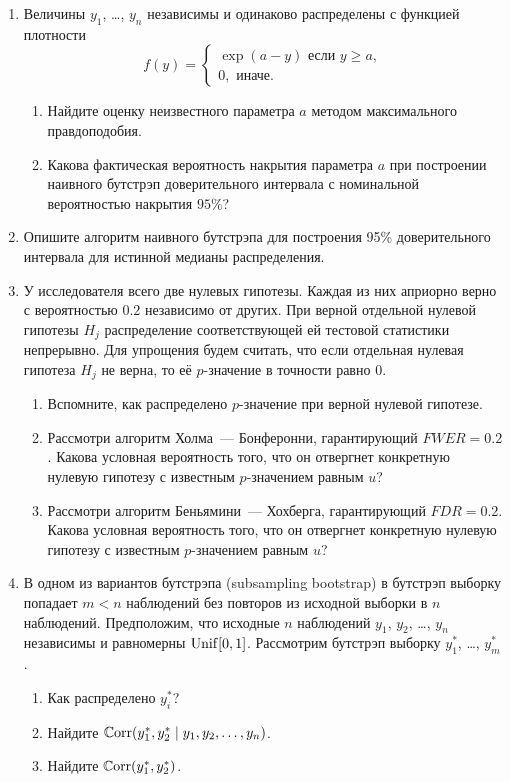 \begin{enumerate}[resume]
    \item Величины $y_1$, \dots, $y_n$ независимы и одинаково распределены 
    с функцией плотности 
    \[
    f(y) = \begin{cases}
        \exp(a - y) \text{ если } y \geq a, \\
        0, \text{ иначе.}
    \end{cases}
    \]
    \begin{enumerate}
        \item Найдите оценку неизвестного параметра $a$ методом максимального правдоподобия. 
        \item Какова фактическая вероятность накрытия параметра $a$ при построении наивного бутстрэп доверительного интервала с номинальной вероятностью накрытия $95\%$?
    \end{enumerate}

    \item Опишите алгоритм наивного бутстрэпа для построения 95\% доверительного интервала для истинной медианы распределения. 

    \item У исследователя всего две нулевых гипотезы. 
    Каждая из них априорно верно с вероятностью $0.2$ независимо от других. 
    При верной отдельной нулевой гипотезы $H_j$ распределение соответствующей ей тестовой статистики непрерывно.
    Для упрощения будем считать, что если отдельная нулевая гипотеза $H_j$ не верна, то её $p$-значение в точности равно $0$.

    \begin{enumerate}
        \item Вспомните, как распределено $p$-значение при верной нулевой гипотезе.
        \item Рассмотри алгоритм Холма~— Бонферонни, гарантирующий $FWER = 0.2$.
        Какова условная вероятность того, что он отвергнет конкретную нулевую гипотезу с известным $p$-значением равным $u$?
        \item Рассмотри алгоритм Беньямини~— Хохберга, гарантирующий $FDR = 0.2$.
        Какова условная вероятность того, что он отвергнет конкретную нулевую гипотезу с известным $p$-значением равным $u$?
    \end{enumerate}

    \item В одном из вариантов бутстрэпа (subsampling bootstrap) в бутстрэп выборку попадает $m < n$ наблюдений без повторов из исходной выборки в $n$ наблюдений. 
    Предположим, что исходные $n$ наблюдений $y_1$, $y_2$, \dots, $y_n$ независимы и равномерны $\mathrm{Unif}[0, 1]$.
    Рассмотрим бутстрэп выборку $y_1^*$, \dots, $y_m^*$.
    \begin{enumerate}
        \item Как распределено $y_i^*$?
        \item Найдите $\operatorname{\mathbb{C}orr}(y_1^*, y_2^* \mid y_1, y_2, \dots, y_n)$.
        \item Найдите $\operatorname{\mathbb{C}orr}(y_1^*, y_2^*)$.
    \end{enumerate}

 \end{enumerate}

